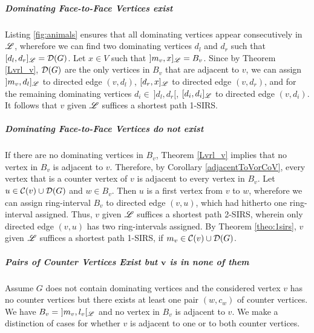 \documentclass[10pt]{article}
\newcommand{\mvv}{\mv{v}}
\newcommand{\dom}{\fu{D}(G)}\newcommand{\dist}[2]{dist(#1,#2)}\newcommand{\first}[1]{\fu{H}(#1)}\newcommand{\last}[1]{\fu{T}(#1)}
\begin{document}
\subparagraph{Dominating Face-to-Face Vertices exist}


Listing \ref{fig:animals} ensures that all dominating vertices appear consecutively in $\mathscr{L}$, 
wherefore we can find two dominating vertices $d_l$ and $d_r$ such that $[d_l,d_r]_{ \ri{L}}=\dom$. 
Let $x\in V$ such that $]\mvv, x]_{ \ri{L}} = B_v$.
Since by Theorem \ref{Lvrl_v}, $\dom$ are the only vertices in $B_v$ that are adjacent to $v$, we can assign $]\mvv,d_l]_{ \ri{L}}$ to directed edge $(v,d_l)$, $[d_r,x]_{ \mathscr{L}}$ to directed edge $(v,d_r)$, and for the remaining dominating vertices $d_i\in~]d_l,d_r[$, $[d_i,d_i]_{\mathscr{L}}$ to directed edge $(v,d_i)$.
It follows that $v$ given $\mathscr{L}$ suffices a shortest path 1-SIRS.


\subparagraph{Dominating Face-to-Face Vertices  do not exist}

If there are no dominating vertices in $B_v$, Theorem \ref{Lvrl_v} implies that no vertex in $B_v$ is adjacent to $v$.
Therefore, by Corollary \ref{adjacentToVorCoV}, every vertex that
is a counter vertex of $v$ is adjacent to every vertex in $B_v$.
Let $u\in\co{v}\cup\dom$ and $w\in B_v$.
Then $u$ is a first vertex 
from $v$ to $w$, wherefore we can assign ring-interval $B_v$ to 
directed edge $(v,u)$, which had hitherto one ring-interval assigned.
Thus, $v$ given $\mathscr{L}$ suffices a shortest path 2-SIRS, wherein only directed edge $(v,u)$ has two ring-intervals assigned.
By Theorem \ref{theo:1sirs}, $v$ given $\mathscr{L}$ suffices a 
shortest path 1-SIRS, if $\mvv\in\co{v}\cup\dom$.





\subparagraph{Pairs of Counter Vertices Exist but $\mathbf{v}$ is in none of them}\label{counteratall}

Assume $G$ does not contain dominating 
vertices and the considered vertex $v$  has no counter vertices but 
there exists at least one pair $(w,c_w)$ of counter vertices.
We have $B_v=~]\mvv,\lvv[_\ri{L}$ and 
no vertex in $B_v$ is adjacent to $v$.
We make a distinction of cases for whether $v$ is adjacent to one or to both counter vertices.
\end{document}

